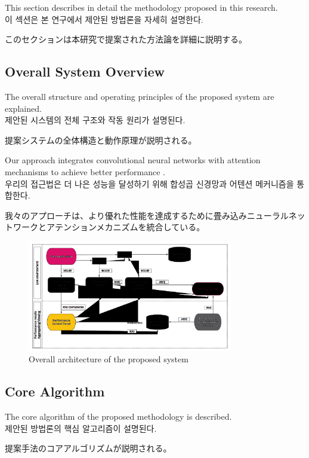 \documentclass[12pt,a4paper]{article}
\begin{document}
This section describes in detail the methodology proposed in this research. \\
이 섹션은 본 연구에서 제안된 방법론을 자세히 설명한다. \\
\begin{CJK}{UTF8}{min}
このセクションは本研究で提案された方法論を詳細に説明する。
\end{CJK}

\subsection{Overall System Overview}
The overall structure and operating principles of the proposed system are explained. \\
제안된 시스템의 전체 구조와 작동 원리가 설명된다. \\
\begin{CJK}{UTF8}{min}
提案システムの全体構造と動作原理が説明される。
\end{CJK}

Our approach integrates convolutional neural networks with attention mechanisms to achieve better performance \cite{vaswani2017attention}. \\
우리의 접근법은 더 나은 성능을 달성하기 위해 합성곱 신경망과 어텐션 메커니즘을 통합한다. \\
\begin{CJK}{UTF8}{min}
我々のアプローチは、より優れた性能を達成するために畳み込みニューラルネットワークとアテンションメカニズムを統合している。
\end{CJK}

\begin{figure}[htbp]
    \centering
    \includegraphics[width=0.8\textwidth]{figures/System-overview-Atomia-Performance-Monitoring-system.png}
    \caption{Overall architecture of the proposed system}
    \label{fig:system_overview}
\end{figure}

\subsection{Core Algorithm}
The core algorithm of the proposed methodology is described. \\
제안된 방법론의 핵심 알고리즘이 설명된다. \\
\begin{CJK}{UTF8}{min}
提案手法のコアアルゴリズムが説明される。
\end{CJK}
\end{document}
